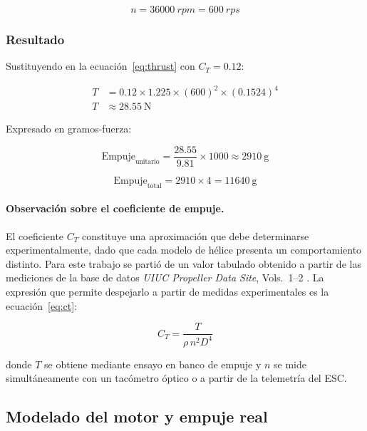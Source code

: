 \documentclass[12pt, letterpaper]{report}
\begin{document}
\begin{equation}
n = \SI{36000}{rpm} = \SI{600}{rps}
\end{equation}

\subsubsection{Resultado}

Sustituyendo en la ecuación~\eqref{eq:thrust} con $C_T = 0.12$:

\begin{align}
T &= 0.12 \times 1.225 \times (600)^{2} \times (0.1524)^{4} \\
T &\approx \SI{28.55}{\newton}
\end{align}

Expresado en gramos-fuerza:

\begin{equation}
\text{Empuje}_{\text{unitario}} = \frac{28.55}{9.81} \times 1000 \approx \SI{2910}{\gram}
\end{equation}

\begin{equation}
\text{Empuje}_{\text{total}} = 2910 \times 4 = \SI{11640}{\gram}
\end{equation}

\paragraph{Observación sobre el coeficiente de empuje.}
El coeficiente $C_T$ constituye una aproximación que debe determinarse 
experimentalmente, dado que cada modelo de hélice presenta un comportamiento 
distinto. Para este trabajo se partió de un valor tabulado obtenido a partir de 
las mediciones de la base de datos \textit{UIUC Propeller Data Site}, 
Vols.~1--2 \cite{ref7}. La expresión que permite despejarlo a partir de 
medidas experimentales es la ecuación~\eqref{eq:ct}:

\begin{equation}
C_T = \frac{T}{\rho \, n^{2} D^{4}}
\label{eq:ct}
\end{equation}

\noindent donde $T$ se obtiene mediante ensayo en banco de empuje y $n$ se mide 
simultáneamente con un tacómetro óptico o a partir de la telemetría del ESC.

\subsection{Modelado del motor y empuje real}
\end{document}
